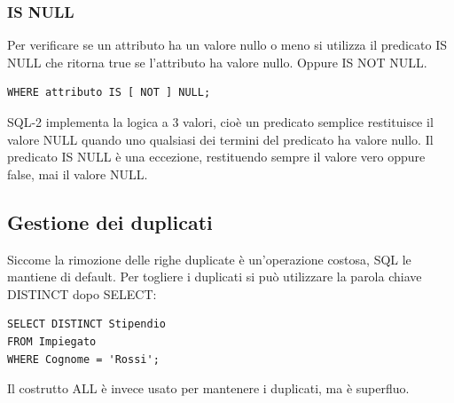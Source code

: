 \documentclass[a4paper]{article}
\begin{document}
\subsubsection{IS NULL}
Per verificare se un attributo ha un valore nullo o meno si utilizza il predicato
IS NULL che ritorna true se l'attributo ha valore nullo. Oppure IS NOT NULL.

\begin{lstlisting}
WHERE attributo IS [ NOT ] NULL;
\end{lstlisting}

SQL-2 implementa la logica a 3 valori, cioè un predicato semplice restituisce il valore
NULL quando uno qualsiasi dei termini del predicato ha valore nullo. Il predicato IS NULL
è una eccezione, restituendo sempre il valore vero oppure false, mai il valore NULL.

\subsection{Gestione dei duplicati}
Siccome la rimozione delle righe duplicate è un'operazione costosa, SQL le mantiene
di default. Per togliere i duplicati si può utilizzare la parola chiave DISTINCT dopo SELECT:
\begin{lstlisting}
SELECT DISTINCT Stipendio
FROM Impiegato
WHERE Cognome = 'Rossi';
\end{lstlisting}

Il costrutto ALL è invece usato per mantenere i duplicati, ma è superfluo.
\end{document}
